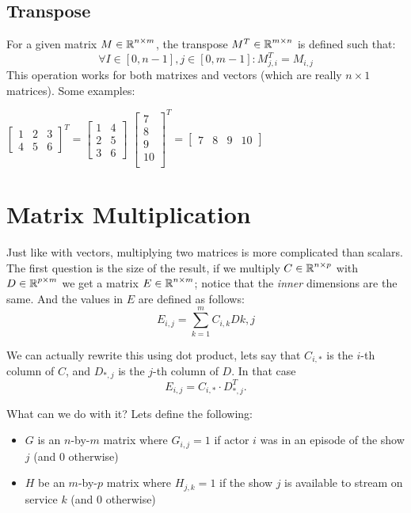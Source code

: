 \subsection{Transpose} 
For a given matrix $M \in \operatorname{\mathbb{R}}^{n\times m}$, the transpose $M^T \in \operatorname{\mathbb{R}}^{m \times n}$ is defined such that:
\[
\forall I\in[0,n-1], j\in[0,m-1] : M^T_{j,i} = M_{i,j} 
\]
This operation works for both matrixes and vectors (which are really $n\times1$ matrices).
Some examples: 
\begin{center}
$\left[\begin{matrix}
1 & 2 & 3\\
4 & 5 & 6
\end{matrix}\right]^T = 
\left[\begin{matrix}
1 & 4 \\
2 & 5 \\
3 & 6
\end{matrix}\right]$%
\hspace{5em}
$\left[\begin{matrix}
7 \\
8 \\
9 \\
10 \\
\end{matrix}\right]^T = \left[\begin{matrix}
7 & 8 & 9 & 10
\end{matrix}\right]
$
\end{center}
\section{Matrix Multiplication}
Just like with vectors, multiplying two matrices is more complicated than scalars. 
The first question is the size of the result, if we multiply $C \in \operatorname{\mathbb{R}}^{n\times p}$ with $D \in \operatorname{\mathbb{R}}^{p\times m}$ we get a matrix $E \in \operatorname{\mathbb{R}}^{n\times m}$;
notice that the \textit{inner} dimensions are the same.
And the values in $E$ are defined as follows:
\[
E_{i,j} = \sum_{k=1}^m C_{i,k}D{k,j}
\]

We can actually rewrite this using dot product, lets say that $C_{i,*}$ is the $i$-th column of $C$, and $D_{*,j}$ is the $j$-th column of $D$.
In that case \[E_{i,j} = C_{i,*}\cdot D_{*,j}^T.\]

What can we do with it? Lets define the following:
\begin{itemize}
\item $G$ is an $n$-by-$m$ matrix where $G_{i,j}=1$ if actor $i$ was in an episode of the show $j$ (and $0$ otherwise)
\item $H$ be an $m$-by-$p$ matrix where $H_{j,k}=1$ if the show $j$ is available to stream on service $k$ (and $0$ otherwise) 
\end{itemize}



